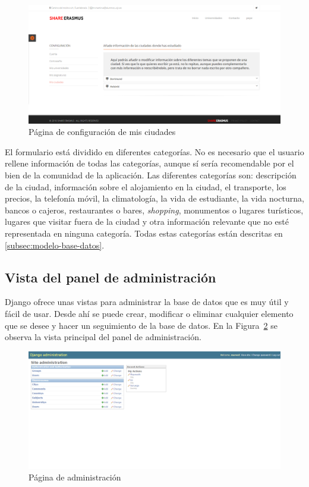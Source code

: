 \documentclass[a4paper, 12pt]{book}
\begin{document}
\begin{figure}[H]
  \centering
  \includegraphics[width=16cm, keepaspectratio]{img/mis-ciudades.png}
  \caption{Página de configuración de mis ciudades}
  \label{fig:mis-ciudades}
\end{figure}

El formulario está dividido en diferentes categorías. No es necesario que el usuario rellene información de todas las categorías, aunque sí sería recomendable por el bien de la comunidad de la aplicación. Las diferentes categorías son: descripción de la ciudad, información sobre el alojamiento en la ciudad, el transporte, los precios, la telefonía móvil, la climatología, la vida de estudiante, la vida nocturna, bancos o cajeros, restaurantes o bares, \textit{shopping}, monumentos o lugares turísticos, lugares que visitar fuera de la ciudad y otra información relevante que no esté representada en ninguna categoría. Todas estas categorías están descritas en \ref{subsec:modelo-base-datos}.

\subsection{Vista del panel de administración} 
\label{subsec:vista-administrador}

Django ofrece unas vistas para administrar la base de datos que es muy útil y fácil de usar. Desde ahí se puede crear, modificar o eliminar cualquier elemento que se desee y hacer un seguimiento de la base de datos. En la Figura~\ref{fig:panel-administracion} se observa la vista principal del panel de administración.

\begin{figure}[H]
  \centering
  \includegraphics[width=16cm, keepaspectratio]{img/panel-administracion.png}
  \caption{Página de administración}
  \label{fig:panel-administracion}
\end{figure}
\end{document}
